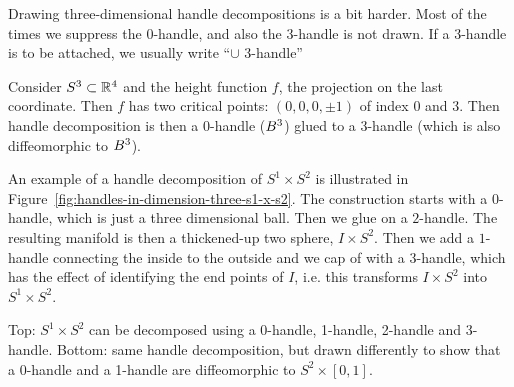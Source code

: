 Drawing three-dimensional handle decompositions is a bit harder. Most of the times we suppress the $0$-handle, and also the $3$-handle is not drawn. If a $3$-handle is to be attached, we usually write ``$\cup $ $3$-handle''

\begin{eg}
    Consider $S^{3} \subset \mathbb{R}^{4}$ and the height function $f$, the projection on the last coordinate.
    Then $f$ has two critical points: $(0, 0, 0, \pm 1)$ of index $0$ and $3$.
    Then handle decomposition is then a $0$-handle ($B^{3}$) glued to a $3$-handle (which is also diffeomorphic to $B^{3}$).
\end{eg}

\begin{eg}
    An example of a handle decomposition of $S^{1} \times S^{2}$ is illustrated in Figure~\ref{fig:handles-in-dimension-three-s1-x-s2}.
    The construction starts with a $0$-handle, which is just a three dimensional ball.
    Then we glue on a $2$-handle.
    The resulting manifold is then a thickened-up   two sphere, $I \times S^{2}$.
    Then we add a $1$-handle connecting the inside to the outside and we cap of with a $3$-handle, which has the effect of identifying the end points of $I$, i.e. this transforms  $I \times S^{2}$ into $ S^1 \times S^{2}$.
\end{eg}
\begin{marginfigure}
    \centering
    \caption{Top: $ S^1 \times S^{2}$ can be decomposed using a 0-handle, 1-handle, 2-handle and 3-handle.
        Bottom: same handle decomposition, but drawn differently to show that  a 0-handle and a 1-handle are diffeomorphic to $S^{2} \times [0,1]$.
}
    \label{fig:handles-in-dimension-three-s1-x-s2}
\end{marginfigure}

